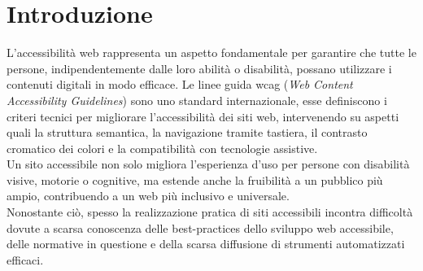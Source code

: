 \chapter{Introduzione}
\label{chap:intro}

\noindent L’accessibilità web rappresenta un aspetto fondamentale per garantire che tutte le persone, indipendentemente dalle loro abilità o disabilità, possano utilizzare i contenuti digitali in modo efficace. Le linee guida \acrshort{wcag} (\textit{Web Content Accessibility Guidelines}) sono uno standard internazionale, esse definiscono i criteri tecnici per migliorare l’accessibilità dei siti web, intervenendo su aspetti quali la struttura semantica, la navigazione tramite tastiera, il contrasto cromatico dei colori e la compatibilità con tecnologie assistive.\\ 
Un sito accessibile non solo migliora l’esperienza d’uso per persone con disabilità visive, motorie o cognitive, ma estende anche la fruibilità a un pubblico più ampio, contribuendo a un web più inclusivo e universale.\\ 
Nonostante ciò, spesso la realizzazione pratica di siti accessibili incontra difficoltà dovute a scarsa conoscenza delle best-practices dello sviluppo web accessibile, delle normative in questione e della scarsa diffusione di strumenti automatizzati efficaci.


